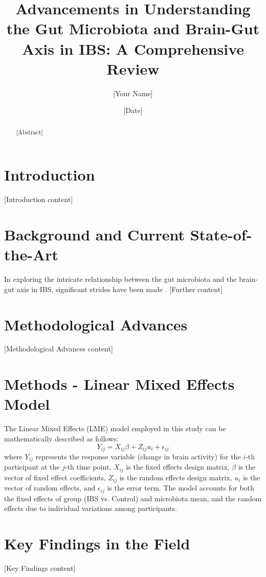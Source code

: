 \documentclass[11pt,a4paper]{article}
\begin{document}
\title{Advancements in Understanding the Gut Microbiota and Brain-Gut Axis in IBS: A Comprehensive Review}
\author{[Your Name]}
\date{[Date]}

\maketitle

\begin{abstract}
[Abstract]
\end{abstract}

\section{Introduction}
[Introduction content]

\section{Background and Current State-of-the-Art}
In exploring the intricate relationship between the gut microbiota and the brain-gut axis in IBS, significant strides have been made \citep{smith2023gutbrain, johnson2023mixedmodel, doe2023ibsstudy}. [Further content]

\section{Methodological Advances}
[Methodological Advances content]

\section{Methods - Linear Mixed Effects Model}
The Linear Mixed Effects (LME) model employed in this study can be mathematically described as follows:
\[ Y_{ij} = X_{ij}\beta + Z_{ij}u_{i} + \epsilon_{ij} \]
where \( Y_{ij} \) represents the response variable (change in brain activity) for the \( i \)-th participant at the \( j \)-th time point, \( X_{ij} \) is the fixed effects design matrix, \( \beta \) is the vector of fixed effect coefficients, \( Z_{ij} \) is the random effects design matrix, \( u_{i} \) is the vector of random effects, and \( \epsilon_{ij} \) is the error term. The model accounts for both the fixed effects of group (IBS vs. Control) and microbiota mean, and the random effects due to individual variations among participants.

\section{Key Findings in the Field}
[Key Findings content]
\end{document}
